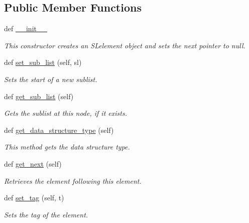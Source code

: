 \subsection*{Public Member Functions}
\begin{DoxyCompactItemize}
\item 
def \hyperlink{class_bridges_1_1ml__element_1_1_m_lelement_adf0e6222eabf94839df4106961c03a04}{\+\_\+\+\_\+init\+\_\+\+\_\+}
\begin{DoxyCompactList}\small\item\em This constructor creates an S\+Lelement object and sets the next pointer to null. \end{DoxyCompactList}\item 
def \hyperlink{class_bridges_1_1ml__element_1_1_m_lelement_ae1d401e972853ffab974aaa1dd44ab0e}{set\+\_\+sub\+\_\+list} (self, sl)
\begin{DoxyCompactList}\small\item\em Sets the start of a new sublist. \end{DoxyCompactList}\item 
def \hyperlink{class_bridges_1_1ml__element_1_1_m_lelement_ab60b9e960312e5210793bff87a6b81c8}{get\+\_\+sub\+\_\+list} (self)
\begin{DoxyCompactList}\small\item\em Gets the sublist at this node, if it exists. \end{DoxyCompactList}\item 
def \hyperlink{class_bridges_1_1ml__element_1_1_m_lelement_a66dc302580aedb52f17d138c54deceb2}{get\+\_\+data\+\_\+structure\+\_\+type} (self)
\begin{DoxyCompactList}\small\item\em This method gets the data structure type. \end{DoxyCompactList}\item 
def \hyperlink{class_bridges_1_1ml__element_1_1_m_lelement_ab4035d339d6133c3b2aab19028aafdf2}{get\+\_\+next} (self)
\begin{DoxyCompactList}\small\item\em Retrieves the element following this element. \end{DoxyCompactList}\item 
def \hyperlink{class_bridges_1_1ml__element_1_1_m_lelement_a5f093a6896365033a3a658a81b0024fe}{set\+\_\+tag} (self, t)
\begin{DoxyCompactList}\small\item\em Sets the tag of the element. \end{DoxyCompactList}\item 

\end{DoxyCompactItemize}
